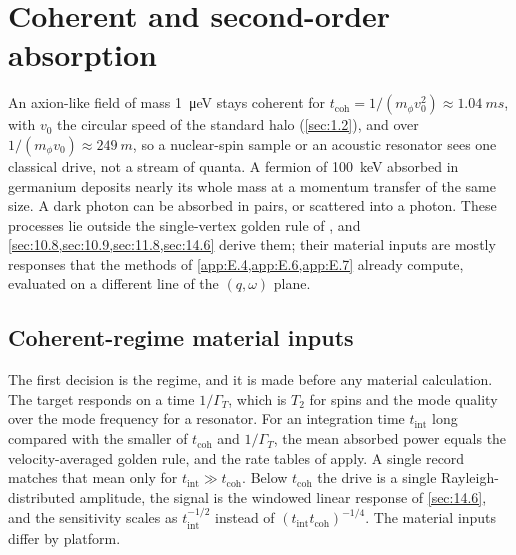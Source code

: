 \section{Coherent and second-order absorption}\label{app:E.26}

An axion-like field of mass \SI{1}{\micro eV} stays coherent for $t_{\mathrm{coh}} = 1/(m_\phi v_0^2) \approx \SI{1.04}{ms}$, with $v_0$ the circular speed of the standard halo (\cref{sec:1.2}), and over $1/(m_\phi v_0) \approx \SI{249}{m}$, so a nuclear-spin sample or an acoustic resonator sees one classical drive, not a stream of quanta. A fermion of \SI{100}{keV} absorbed in germanium deposits nearly its whole mass at a momentum transfer of the same size. A dark photon can be absorbed in pairs, or scattered into a photon. These processes lie outside the single-vertex golden rule of , and \cref{sec:10.8,sec:10.9,sec:11.8,sec:14.6} derive them; their material inputs are mostly responses that the methods of \cref{app:E.4,app:E.6,app:E.7} already compute, evaluated on a different line of the $(q, \omega)$ plane.

\subsection{Coherent-regime material inputs}

The first decision is the regime, and it is made before any material calculation. The target responds on a time $1/\varGamma_T$, which is $T_2$ for spins and the mode quality over the mode frequency for a resonator. For an integration time $t_{\mathrm{int}}$ long compared with the smaller of $t_{\mathrm{coh}}$ and $1/\varGamma_T$, the mean absorbed power equals the velocity-averaged golden rule, and the rate tables of  apply. A single record matches that mean only for $t_{\mathrm{int}} \gg t_{\mathrm{coh}}$. Below $t_{\mathrm{coh}}$ the drive is a single Rayleigh-distributed amplitude, the signal is the windowed linear response of \cref{sec:14.6}, and the sensitivity scales as $t_{\mathrm{int}}^{-1/2}$ instead of $(t_{\mathrm{int}}t_{\mathrm{coh}})^{-1/4}$. The material inputs differ by platform.

